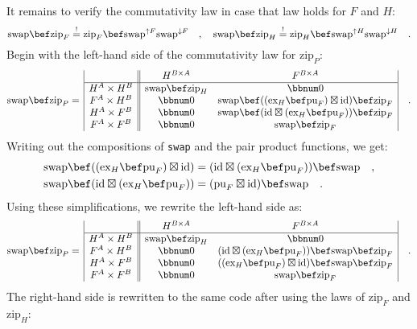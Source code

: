 It remains to verify the commutativity law in case that law holds
for $F$ and $H$:
\[
\text{swap}\bef\text{zip}_{F}\overset{!}{=}\text{zip}_{F}\bef\text{swap}^{\uparrow F}\text{swap}^{\downarrow F}\quad,\quad\text{swap}\bef\text{zip}_{H}\overset{!}{=}\text{zip}_{H}\bef\text{swap}^{\uparrow H}\text{swap}^{\downarrow H}\quad.
\]
Begin with the left-hand side of the commutativity law for $\text{zip}_{P}$:
\[
\text{swap}\bef\text{zip}_{P}=\,\begin{array}{|c||cc|}
 & H^{B\times A} & F^{B\times A}\\
\hline H^{A}\times H^{B} & \text{swap}\bef\text{zip}_{H} & \bbnum 0\\
F^{A}\times H^{B} & \bbnum 0 & \text{swap}\bef((\text{ex}_{H}\bef\text{pu}_{F})\boxtimes\text{id})\bef\text{zip}_{F}\\
H^{A}\times F^{B} & \bbnum 0 & \text{swap}\bef(\text{id}\boxtimes(\text{ex}_{H}\bef\text{pu}_{F}))\bef\text{zip}_{F}\\
F^{A}\times F^{B} & \bbnum 0 & \text{swap}\bef\text{zip}_{F}
\end{array}\quad.
\]
Writing out the compositions of \lstinline!swap! and the pair product
functions, we get:
\begin{align*}
 & \text{swap}\bef((\text{ex}_{H}\bef\text{pu}_{F})\boxtimes\text{id})=(\text{id}\boxtimes(\text{ex}_{H}\bef\text{pu}_{F}))\bef\text{swap}\quad,\\
 & \text{swap}\bef(\text{id}\boxtimes(\text{ex}_{H}\bef\text{pu}_{F}))=(\text{pu}_{F}\boxtimes\text{id})\bef\text{swap}\quad.
\end{align*}
Using these simplifications, we rewrite the left-hand side as:
\[
\text{swap}\bef\text{zip}_{P}=\,\begin{array}{|c||cc|}
 & H^{B\times A} & F^{B\times A}\\
\hline H^{A}\times H^{B} & \text{swap}\bef\text{zip}_{H} & \bbnum 0\\
F^{A}\times H^{B} & \bbnum 0 & (\text{id}\boxtimes(\text{ex}_{H}\bef\text{pu}_{F}))\bef\text{swap}\bef\text{zip}_{F}\\
H^{A}\times F^{B} & \bbnum 0 & ((\text{ex}_{H}\bef\text{pu}_{F})\boxtimes\text{id})\bef\text{swap}\bef\text{zip}_{F}\\
F^{A}\times F^{B} & \bbnum 0 & \text{swap}\bef\text{zip}_{F}
\end{array}\quad.
\]
The right-hand side is rewritten to the same code after using the
laws of $\text{zip}_{F}$ and $\text{zip}_{H}$:
